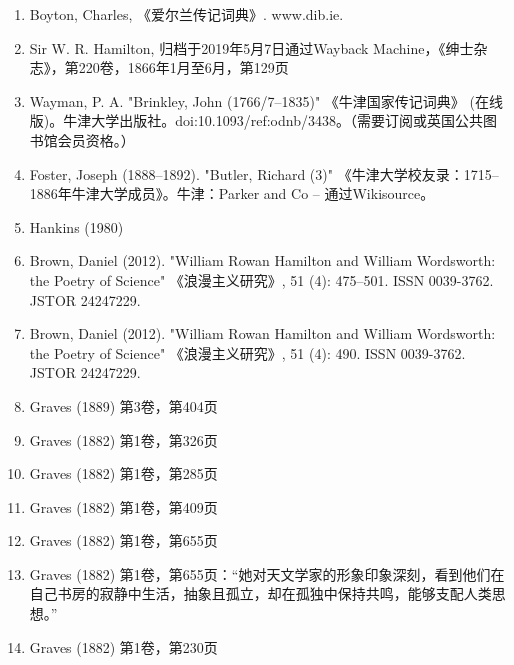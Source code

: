 \begin{enumerate}
\item Boyton, Charles, 《爱尔兰传记词典》. www.dib.ie.  
\item Sir W. R. Hamilton, 归档于2019年5月7日通过Wayback Machine，《绅士杂志》，第220卷，1866年1月至6月，第129页  
\item Wayman, P. A. "Brinkley, John (1766/7–1835)" 《牛津国家传记词典》 (在线版)。牛津大学出版社。doi:10.1093/ref:odnb/3438。（需要订阅或英国公共图书馆会员资格。）  
\item Foster, Joseph (1888–1892). "Butler, Richard (3)" 《牛津大学校友录：1715–1886年牛津大学成员》。牛津：Parker and Co – 通过Wikisource。  
\item Hankins (1980)  
\item Brown, Daniel (2012). "William Rowan Hamilton and William Wordsworth: the Poetry of Science" 《浪漫主义研究》, 51 (4): 475–501. ISSN 0039-3762. JSTOR 24247229.  
\item Brown, Daniel (2012). "William Rowan Hamilton and William Wordsworth: the Poetry of Science" 《浪漫主义研究》, 51 (4): 490. ISSN 0039-3762. JSTOR 24247229.  
\item Graves (1889) 第3卷，第404页  
\item Graves (1882) 第1卷，第326页  
\item Graves (1882) 第1卷，第285页  
\item Graves (1882) 第1卷，第409页  
\item Graves (1882) 第1卷，第655页  
\item Graves (1882) 第1卷，第655页：“她对天文学家的形象印象深刻，看到他们在自己书房的寂静中生活，抽象且孤立，却在孤独中保持共鸣，能够支配人类思想。”  
\item Graves (1882) 第1卷，第230页
\end{enumerate}